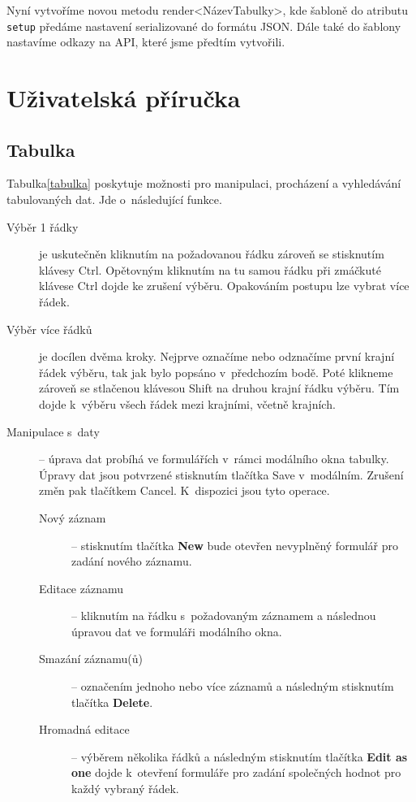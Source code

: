 \documentclass[thesis=B,czech]{FITthesis}[2012/06/26]
\begin{document}
	Nyní vytvoříme novou metodu render<NázevTabulky>, kde šabloně do atributu \verb|setup| předáme nastavení serializované do formátu JSON. Dále také do šablony nastavíme odkazy na API, které jsme předtím vytvořili.



\section{Uživatelská příručka}

\subsection{Tabulka}
	Tabulka\ref{tabulka} poskytuje možnosti pro manipulaci, procházení a vyhledávání tabulovaných dat. Jde o~následující funkce.
	\begin{description}
		\item[Výběr 1 řádky] je uskutečněn kliknutím na požadovanou řádku zároveň se stisknutím klávesy Ctrl. Opětovným kliknutím na tu samou řádku při zmáčkuté klávese Ctrl dojde ke zrušení výběru. Opakováním postupu lze vybrat více řádek.
		\item[Výběr více řádků] je docílen dvěma kroky. Nejprve označíme nebo odznačíme první krajní řádek výběru, tak jak bylo popsáno v~předchozím bodě. Poté klikneme zároveň se stlačenou klávesou Shift na druhou krajní řádku výběru. Tím dojde k~výběru všech řádek mezi krajními, včetně krajních.
		\item[Manipulace s~daty] -- úprava dat probíhá ve formulářích v~rámci modálního okna tabulky. Úpravy dat jsou potvrzené stisknutím tlačítka Save v~modálním. Zrušení změn pak tlačítkem Cancel. K~dispozici jsou tyto operace.
			\begin{description}
				\item[Nový záznam] -- stisknutím tlačítka \textbf{New} bude otevřen nevyplněný formulář pro zadání nového záznamu.
				\item[Editace záznamu] -- kliknutím na řádku s~požadovaným záznamem a následnou úpravou dat ve formuláři modálního okna.
				\item[Smazání záznamu(ů)] -- označením jednoho nebo více záznamů a následným stisknutím tlačítka \textbf{Delete}.
				\item[Hromadná editace] -- výběrem několika řádků a následným stisknutím tlačítka \textbf{Edit as one} dojde k~otevření formuláře pro zadání společných hodnot pro každý vybraný řádek.
			\end{description}

\end{description}
\end{document}
